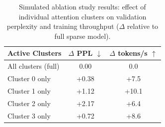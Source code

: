 
\begin{table}[ht]
  \centering
  \caption{Simulated ablation study results: effect of individual attention clusters on validation perplexity and training throughput ($\Delta$ relative to full sparse model).}
  \label{tab:simulated_ablation}
  \begin{tabular}{lcc}
    \toprule
    Active Clusters & $\Delta$ PPL $\downarrow$ & $\Delta$ tokens/s $\uparrow$ \\
    \midrule
    All clusters (full) & 0.00 & 0.0 \\
    Cluster 0 only & +0.38 & +7.5 \\
    Cluster 1 only & +1.12 & +10.1 \\
    Cluster 2 only & +2.17 & +6.4 \\
    Cluster 3 only & +0.72 & +8.6 \\
    \bottomrule
  \end{tabular}
\end{table}
